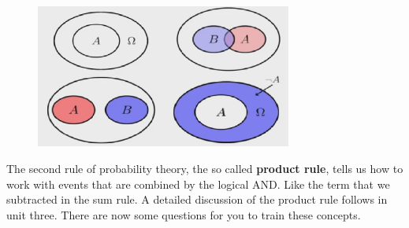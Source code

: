 \documentclass[12pt, a4paper]{scrartcl}
\begin{document}
\\
\begin{figure}[H]
	\centering
	\includegraphics[width=0.75\textwidth]{1_3.png}
\end{figure}

The second rule of probability theory, the so called \textbf{product rule}, tells us how to work with events that are combined by the logical AND. Like the term that we subtracted in the sum rule. A detailed discussion of the product rule follows in unit three. There are now some questions for you to train these concepts.\\
\end{document}
